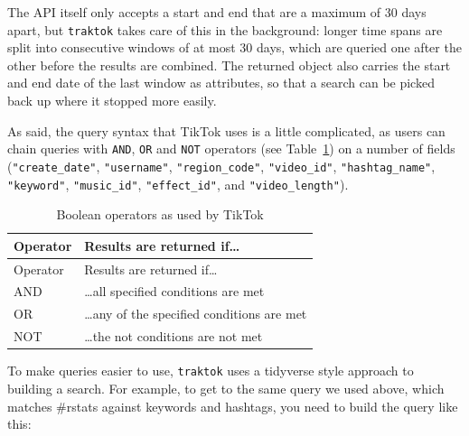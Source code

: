 \documentclass[
  nobib]{ccr}
\begin{document}
The API itself only accepts a start and end that are a maximum of 30
days apart, but \texttt{traktok} takes care of this in the background:
longer time spans are split into consecutive windows of at most 30 days,
which are queried one after the other before the results are combined.
The returned object also carries the start and end date of the last
window as attributes, so that a search can be picked back up where it
stopped more easily.

As said, the query syntax that TikTok uses is a little complicated, as
users can chain queries with \texttt{AND}, \texttt{OR} and \texttt{NOT}
operators (see Table~\ref{tbl-boolean}) on a number of fields
(\texttt{"create\_date"}, \texttt{"username"}, \texttt{"region\_code"},
\texttt{"video\_id"}, \texttt{"hashtag\_name"}, \texttt{"keyword"},
\texttt{"music\_id"}, \texttt{"effect\_id"}, and
\texttt{"video\_length"}).

\begin{longtable}[]{@{}ll@{}}
\caption{Boolean operators as used by
TikTok}\label{tbl-boolean}\tabularnewline
\toprule\noalign{}
Operator & Results are returned if\ldots{} \\
\midrule\noalign{}
\endfirsthead
\toprule\noalign{}
Operator & Results are returned if\ldots{} \\
\midrule\noalign{}
\endhead
\bottomrule\noalign{}
\endlastfoot
AND & \ldots all specified conditions are met \\
OR & \ldots any of the specified conditions are met \\
NOT & \ldots the not conditions are not met \\
\end{longtable}

To make queries easier to use, \texttt{traktok} uses a tidyverse style
approach to building a search. For example, to get to the same query we
used above, which matches \#rstats against keywords and hashtags, you
need to build the query like this:
\end{document}

